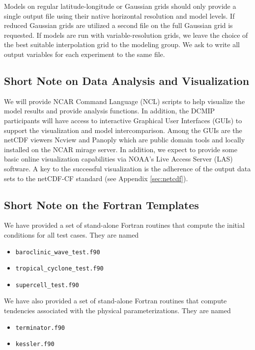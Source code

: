 \documentclass[times,doublespace]{fldauth}
\begin{document}
Models on regular latitude-longitude or Gaussian grids should only provide a single output file using their native horizontal resolution and model levels. If reduced Gaussian grids are utilized a second file on the full Gaussian grid is requested. 
If models are run with variable-resolution grids, we leave the choice of the best suitable interpolation grid to the modeling group. We ask to write all output variables for each experiment to the same file.

\subsection{Short Note on Data Analysis and Visualization}
We will provide NCAR Command Language (NCL) scripts to help visualize the model results and provide analysis functions. In addition, the DCMIP participants will have access to interactive Graphical User Interfaces (GUIs) to support the visualization and model intercomparison. Among the GUIs are the netCDF viewers Ncview and Panoply which are public domain tools and locally installed on the NCAR mirage server. In addition, we expect to provide some basic online visualization capabilities via NOAA's Live Access Server (LAS) software. A key to the successful visualization is the adherence of the output data sets to the netCDF-CF standard (see Appendix \ref{sec:netcdf}).

\subsection{Short Note on the Fortran Templates}
\label{sec:template}
We have provided a set of stand-alone Fortran routines that compute the initial conditions for all test cases. They are named

\begin{itemize}
\item \texttt{baroclinic\_wave\_test.f90}
\item \texttt{tropical\_cyclone\_test.f90}
\item \texttt{supercell\_test.f90}
\end{itemize}

We have also provided a set of stand-alone Fortran routines that compute tendencies associated with the physical parameterizations.  They are named

\begin{itemize}
\item \texttt{terminator.f90}
\item \texttt{kessler.f90}
\end{itemize}
\end{document}
